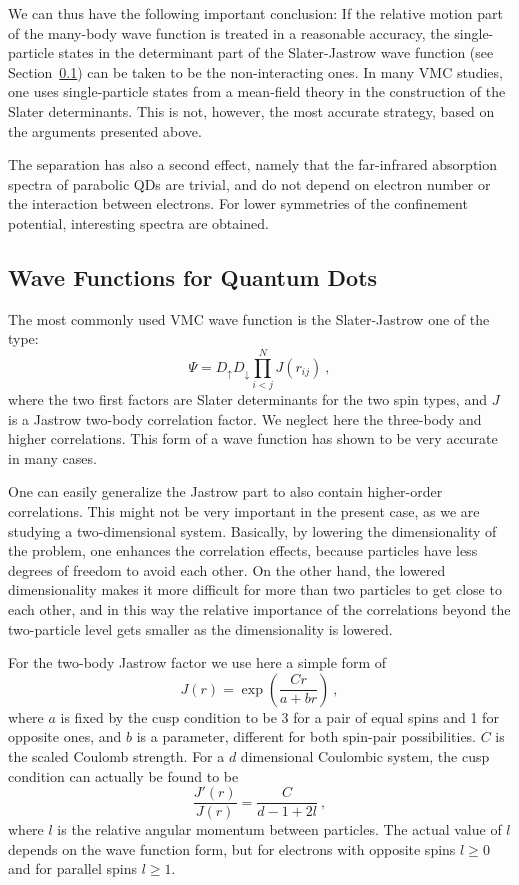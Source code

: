 \documentclass{article}
\begin{document}
We can thus have the following important conclusion: If the relative
motion part of the many-body wave function is treated in a reasonable
accuracy, the single-particle states in the determinant part of the
Slater-Jastrow wave function (see Section~\ref{WFs}) can be taken to
be the non-interacting ones. In many VMC studies, one uses
single-particle states from a mean-field theory in the construction of
the Slater determinants. This is not, however, the most accurate
strategy, based on the arguments presented above\cite{cyrus}.

The separation has also a second effect, namely that the far-infrared
absorption spectra of parabolic QDs are trivial, and do not depend on
electron number or the interaction between electrons. For lower
symmetries of the confinement potential, interesting spectra are
obtained\cite{FIR,fir2}.

\subsection{Wave Functions for Quantum Dots}\label{WFs}

The most commonly used VMC wave function is the Slater-Jastrow one of
the type:
\begin{equation}
\Psi = D_{\uparrow} D_{\downarrow} \prod_{i<j}^N J(r_{ij}) \ ,
\label{wf}
\end{equation}
where the two first factors are Slater determinants for the two spin
types, and $J$ is a Jastrow two-body correlation factor. We neglect
here the three-body and higher correlations. This form of a wave
function has shown to be very accurate in many cases\cite{QMCRMP}.

One can easily generalize the Jastrow part to also contain
higher-order correlations. This might not be very important in the
present case, as we are studying a two-dimensional system. Basically,
by lowering the dimensionality of the problem, one enhances the
correlation effects, because particles have less degrees of freedom to
avoid each other. On the other hand, the lowered dimensionality makes
it more difficult for more than two particles to get close to each
other, and in this way the relative importance of the correlations
beyond the two-particle level gets smaller as the dimensionality is
lowered\cite{thanks1}.

For the two-body Jastrow factor we use here a simple form of
\begin{equation}
J(r)=\exp\left({\frac{C r}{a+b r}}\right) \ ,
\label{Jsimple}
\end{equation}
where $a$ is fixed by the cusp condition to be 3 for a pair of equal
spins and 1 for opposite ones, and $b$ is a parameter, different for
both spin-pair possibilities. $C$ is the scaled Coulomb strength.  For
a $d$ dimensional Coulombic system, the cusp condition can actually be
found to be
\begin{equation}
\frac{J'(r)}{J(r)}=\frac{C}{d-1+2 l} \ ,
\end{equation}
where $l$ is the relative angular momentum between particles. The
actual value of $l$ depends on the wave function form, but for
electrons with opposite spins $l \ge 0$ and for parallel spins $l \ge
1$.
\end{document}
